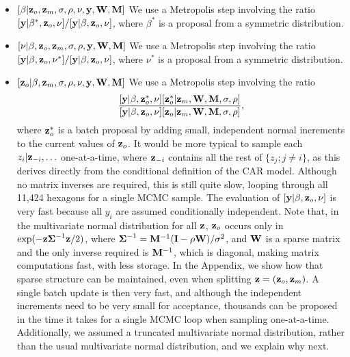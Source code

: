\documentclass[11pt, titlepage]{article}
\begin{document}
\begin{spacing}{1.9}
\begin{flushleft}
\begin{itemize}
  \item $[\beta|\mathbf{z}_{o},\mathbf{z}_{m},\sigma,\rho,\nu,\mathbf{y},\mathbf{W},\mathbf{M}]$ We use a Metropolis step involving the ratio $[\mathbf{y}|\beta^{*},\mathbf{z}_{o},\nu]/[\mathbf{y}|\beta,\mathbf{z}_{o},\nu]$, where $\beta^{*}$ is a proposal from a symmetric distribution. 
  \item $[\nu|\beta,\mathbf{z}_{o},\mathbf{z}_{m},\sigma,\rho,\mathbf{y},\mathbf{W},\mathbf{M}]$ We use a Metropolis step involving the ratio $[\mathbf{y}|\beta,\mathbf{z}_{o},\nu^{*}]/[\mathbf{y}|\beta,\mathbf{z}_{o},\nu]$, where $\nu^{*}$ is a proposal from a symmetric distribution.
  \item $[\mathbf{z}_{o}|\beta,\mathbf{z}_{m},\sigma,\rho,\nu,\mathbf{y},\mathbf{W},\mathbf{M}]$ We use a Metropolis step involving the ratio
  \begin{equation} \label{eq:MetroZ}
   \frac{[\mathbf{y}|\beta,\mathbf{z}_{o}^{*},\nu][\mathbf{z}_{o}^{*}|\mathbf{z}_{m},\mathbf{W},\mathbf{M},\sigma,\rho]}{[\mathbf{y}|\beta,\mathbf{z}_{o},\nu][\mathbf{z}_{o}|\mathbf{z}_{m},\mathbf{W},\mathbf{M},\sigma,\rho]},
  \end{equation}
  where $\mathbf{z}_{o}^{*}$ is a batch proposal by adding small, independent normal increments to the current values of $\mathbf{z}_{o}$. It would be more typical to sample each $z_{i}|\mathbf{z}_{-i},\ldots$ one-at-a-time, where $\mathbf{z}_{-i}$ contains all the rest of $\{z_{j}; j \ne i\}$, as this derives directly from the conditional definition of the CAR model.  Although no matrix inverses are required, this is still quite slow, looping through all 11,424 hexagons for a single MCMC sample.  The evaluation of $[\mathbf{y}|\beta,\mathbf{z}_{o},\nu]$ is very fast because all $y_{i}$ are assumed conditionally independent. Note that, in the multivariate normal distribution for all $\mathbf{z}$, $\mathbf{z}_{o}$ occurs only in $\exp(-\mathbf{z}\mbox{\boldmath $\Sigma$}^{-1}\mathbf{z}/2)$, where $\mbox{\boldmath $\Sigma$}^{-1} = \mathbf{M}^{-1}(\mathbf{I} - \rho\mathbf{W})/\sigma^{2}$, and $\mathbf{W}$ is a sparse matrix and the only inverse required is $\mathbf{M}^{-1}$, which is diagonal, making matrix computations fast, with less storage. In the Appendix, we show how that sparse structure can be maintained, even when splitting $\mathbf{z} = (\mathbf{z}_{o}, \mathbf{z}_{m})$. A single batch update is then very fast, and although the independent increments need to be very small for acceptance, thousands can be proposed in the time it takes for a single MCMC loop when sampling one-at-a-time.  Additionally, we assumed a truncated multivariate normal distribution, rather than the usual multivariate normal distribution, and we explain why next.

\end{itemize}
\end{flushleft}
\end{spacing}
\end{document}
